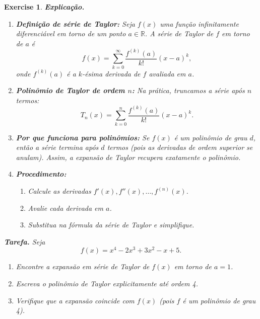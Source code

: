 \documentclass[12pt,a4paper]{article}
\newtheorem{exercise}{Exercise}[section]
\begin{document}
\begin{exercise}
\textbf{Explicação.}

\begin{enumerate}
  \item \textbf{Definição de série de Taylor:}  
  Seja $f(x)$ uma função infinitamente diferenciável em torno de um ponto $a \in \mathbb{R}$. A \emph{série de Taylor} de $f$ em torno de $a$ é
  \[
  f(x) = \sum_{k=0}^{\infty} \frac{f^{(k)}(a)}{k!}(x-a)^k,
  \]
  onde $f^{(k)}(a)$ é a $k$-ésima derivada de $f$ avaliada em $a$.

  \item \textbf{Polinômio de Taylor de ordem $n$:}  
  Na prática, truncamos a série após $n$ termos:
  \[
  T_n(x) = \sum_{k=0}^{n} \frac{f^{(k)}(a)}{k!}(x-a)^k.
  \]

  \item \textbf{Por que funciona para polinômios:}  
  Se $f(x)$ é um polinômio de grau $d$, então a série termina após $d$ termos (pois as derivadas de ordem superior se anulam). Assim, a expansão de Taylor recupera exatamente o polinômio.

  \item \textbf{Procedimento:}  
  \begin{enumerate}[label=(\roman*)]
    \item Calcule as derivadas $f'(x), f''(x), \ldots, f^{(n)}(x)$.  
    \item Avalie cada derivada em $a$.  
    \item Substitua na fórmula da série de Taylor e simplifique.  
  \end{enumerate}
\end{enumerate}

\bigskip

\textbf{Tarefa.}  
Seja 
\[
f(x) = x^4 - 2x^3 + 3x^2 - x + 5.
\]
\begin{enumerate}[label=(\alph*)]
    \item Encontre a expansão em série de Taylor de $f(x)$ em torno de $a = 1$.  
    \item Escreva o polinômio de Taylor explicitamente até ordem 4.  
    \item Verifique que a expansão coincide com $f(x)$ (pois $f$ é um polinômio de grau 4).  
\end{enumerate}
\end{exercise}
\end{document}
